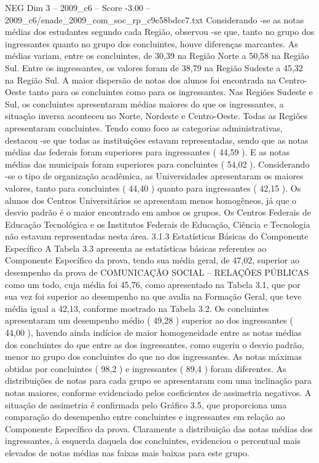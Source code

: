 \begin{textsample}{NEG Dim 3 – 2009\_c6 – Score -3.00 – 2009\_c6/enade\_2009\_com\_soc\_rp\_c9c58bdcc7.txt}
Considerando -se as notas médias dos estudantes segundo cada Região, observou -se que, tanto no grupo dos ingressantes quanto no grupo dos concluintes, houve diferenças marcantes.
As médias variam, entre os concluintes, de 30,39 na Região Norte a 50,58 na Região Sul.
Entre os ingressantes, os valores foram de 38,79 na Região Sudeste a 45,32 na Região Sul.
A maior dispersão de notas dos alunos foi encontrada na Centro-Oeste tanto para os concluintes como para os ingressantes.
Nas Regiões Sudeste e Sul, os concluintes apresentaram médias maiores do que os ingressantes, a situação inversa aconteceu no Norte, Nordeste e Centro-Oeste.
Todas as Regiões apresentaram concluintes.
Tendo como foco as categorias administrativas, destacou -se que todas as instituições estavam representadas, sendo que as notas médias das federais foram superiores para ingressantes ( 44,59 ).
E as notas médias das municipais foram superiores para concluintes ( 54,02 ).
Considerando -se o tipo de organização acadêmica, as Universidades apresentaram os maiores valores, tanto para concluintes ( 44,40 ) quanto para ingressantes ( 42,15 ).
Os alunos dos Centros Universitários se apresentam menos homogêneos, já que o desvio padrão é o maior encontrado em ambos os grupos.
Os Centros Federais de Educação Tecnológica e os Institutos Federais de Educação, Ciência e Tecnologia não estavam representadas nesta área. 3.1.3 Estatísticas Básicas do Componente Específico A Tabela 3.3 apresenta as estatísticas básicas referentes ao Componente Específico da prova, tendo sua média geral, de 47,02, superior ao desempenho da prova de COMUNICAÇÃO SOCIAL – RELAÇÕES PÚBLICAS como um todo, cuja média foi 45,76, como apresentado na Tabela 3.1, que por sua vez foi superior ao desempenho na que avalia na Formação Geral, que teve média igual a 42,13, conforme mostrado na Tabela 3.2.
Os concluintes apresentaram um desempenho médio ( 49,28 ) superior ao dos ingressantes ( 44,00 ), havendo ainda indícios de maior homogeneidade entre as notas médias dos concluintes do que entre as dos ingressantes, como sugeriu o desvio padrão, menor no grupo dos concluintes do que no dos ingressantes.
As notas máximas obtidas por concluintes ( 98,2 ) e ingressantes ( 89,4 ) foram diferentes.
As distribuições de notas para cada grupo se apresentaram com uma inclinação para notas maiores, conforme evidenciado pelos coeficientes de assimetria negativos.
A situação de assimetria é confirmada pelo Gráfico 3.5, que proporciona uma comparação do desempenho entre concluintes e ingressantes em relação ao Componente Específico da prova.
Claramente a distribuição das notas médias dos ingressantes, à esquerda daquela dos concluintes, evidenciou o percentual mais elevados de notas médias nas faixas mais baixas para este grupo.

\end{textsample}
